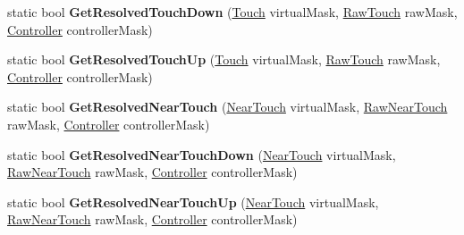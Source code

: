 \begin{DoxyCompactItemize}
\item 
\mbox{\label{class_o_v_r_input_af753d69edbbc642af9253f40e31d1fb9}} 
static bool {\bfseries Get\+Resolved\+Touch\+Down} (\mbox{\hyperlink{class_o_v_r_input_a4e1f1eb856223383aefc1965dd2db39a}{Touch}} virtual\+Mask, \mbox{\hyperlink{class_o_v_r_input_a6e130faa2035c5b20853c1177d909cc6}{Raw\+Touch}} raw\+Mask, \mbox{\hyperlink{class_o_v_r_input_a5c86f9052a9cbb0b73779ff5704d60a8}{Controller}} controller\+Mask)
\item 
\mbox{\label{class_o_v_r_input_a910c1ec9c5cdc311f9441aff20c65a5b}} 
static bool {\bfseries Get\+Resolved\+Touch\+Up} (\mbox{\hyperlink{class_o_v_r_input_a4e1f1eb856223383aefc1965dd2db39a}{Touch}} virtual\+Mask, \mbox{\hyperlink{class_o_v_r_input_a6e130faa2035c5b20853c1177d909cc6}{Raw\+Touch}} raw\+Mask, \mbox{\hyperlink{class_o_v_r_input_a5c86f9052a9cbb0b73779ff5704d60a8}{Controller}} controller\+Mask)
\item 
\mbox{\label{class_o_v_r_input_a5aac63c2f4dee096ea1a219c8d83dd1c}} 
static bool {\bfseries Get\+Resolved\+Near\+Touch} (\mbox{\hyperlink{class_o_v_r_input_afa31aa573064be9bab8fc9e58cddeab6}{Near\+Touch}} virtual\+Mask, \mbox{\hyperlink{class_o_v_r_input_ac9c3c10aa9911507c6dc66e2dd6ec60e}{Raw\+Near\+Touch}} raw\+Mask, \mbox{\hyperlink{class_o_v_r_input_a5c86f9052a9cbb0b73779ff5704d60a8}{Controller}} controller\+Mask)
\item 
\mbox{\label{class_o_v_r_input_a7fcbeccc2235e052fdfa4ab8e6607d4b}} 
static bool {\bfseries Get\+Resolved\+Near\+Touch\+Down} (\mbox{\hyperlink{class_o_v_r_input_afa31aa573064be9bab8fc9e58cddeab6}{Near\+Touch}} virtual\+Mask, \mbox{\hyperlink{class_o_v_r_input_ac9c3c10aa9911507c6dc66e2dd6ec60e}{Raw\+Near\+Touch}} raw\+Mask, \mbox{\hyperlink{class_o_v_r_input_a5c86f9052a9cbb0b73779ff5704d60a8}{Controller}} controller\+Mask)
\item 
\mbox{\label{class_o_v_r_input_ad7cdd19f56cdbc157116ae0f1d54efb2}} 
static bool {\bfseries Get\+Resolved\+Near\+Touch\+Up} (\mbox{\hyperlink{class_o_v_r_input_afa31aa573064be9bab8fc9e58cddeab6}{Near\+Touch}} virtual\+Mask, \mbox{\hyperlink{class_o_v_r_input_ac9c3c10aa9911507c6dc66e2dd6ec60e}{Raw\+Near\+Touch}} raw\+Mask, \mbox{\hyperlink{class_o_v_r_input_a5c86f9052a9cbb0b73779ff5704d60a8}{Controller}} controller\+Mask)

\end{DoxyCompactItemize}
